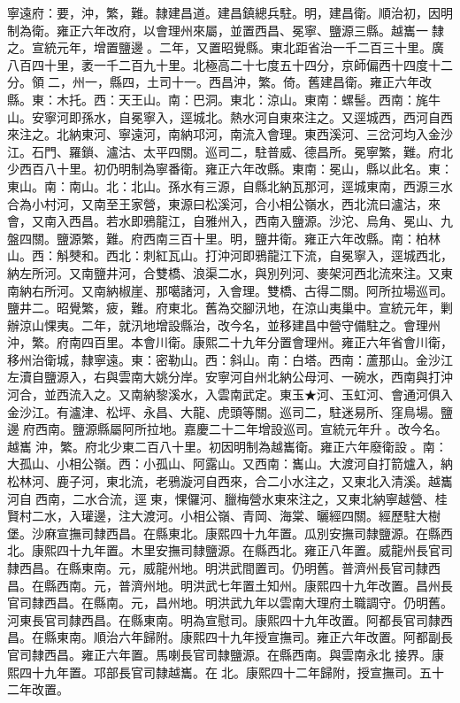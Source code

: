 \begin{pinyinscope}
寧遠府：要，沖，繁，難。隸建昌道。建昌鎮總兵駐。明，建昌衛。順治初，因明制為衛。雍正六年改府，以會理州來屬，並置西昌、冕寧、鹽源三縣。越巂一隸之。宣統元年，增置鹽邊。二年，又置昭覺縣。東北距省治一千二百三十里。廣八百四十里，袤一千二百九十里。北極高二十七度五十四分，京師偏西十四度十二分。領二，州一，縣四，土司十一。西昌沖，繁。倚。舊建昌衛。雍正六年改縣。東：木托。西：天王山。南：巴洞。東北：涼山。東南：螺髻。西南：旄牛山。安寧河即孫水，自冕寧入，逕城北。熱水河自東來注之。又逕城西，西河自西來注之。北納東河、寧遠河，南納邛河，南流入會理。東西溪河、三岔河均入金沙江。石門、羅鎖、瀘沽、太平四關。巡司二，駐普威、德昌所。冕寧繁，難。府北少西百八十里。初仍明制為寧番衛。雍正六年改縣。東南：冕山，縣以此名。東：東山。南：南山。北：北山。孫水有三源，自縣北納瓦那河，逕城東南，西源三水合為小村河，又南至王家營，東源曰松溪河，合小相公嶺水，西北流曰瀘沽，來會，又南入西昌。若水即鴉龍江，自雅州入，西南入鹽源。沙沱、烏角、冕山、九盤四關。鹽源繁，難。府西南三百十里。明，鹽井衛。雍正六年改縣。南：柏林山。西：斛僰和。西北：刺紅瓦山。打沖河即鴉龍江下流，自冕寧入，逕城西北，納左所河。又南鹽井河，合雙橋、浪渠二水，與別列河、麥架河西北流來注。又東南納右所河。又南納椒崖、那噶諸河，入會理。雙橋、古得二關。阿所拉場巡司。鹽井二。昭覺繁，疲，難。府東北。舊為交腳汛地，在涼山夷巢中。宣統元年，剿辦涼山惈夷。二年，就汛地增設縣治，改今名，並移建昌中營守備駐之。會理州沖，繁。府南四百里。本會川衛。康熙二十九年分置會理州。雍正六年省會川衛，移州治衛城，隸寧遠。東：密勒山。西：斜山。南：白塔。西南：蘆那山。金沙江左瀆自鹽源入，右與雲南大姚分岸。安寧河自州北納公母河、一碗水，西南與打沖河合，並西流入之。又南納黎溪水，入雲南武定。東玉★河、玉虹河、會通河俱入金沙江。有瀘津、松坪、永昌、大龍、虎頭等關。巡司二，駐迷易所、窪鳥場。鹽邊府西南。鹽源縣屬阿所拉地。嘉慶二十二年增設巡司。宣統元年升。改今名。越巂沖，繁。府北少東二百八十里。初因明制為越巂衛。雍正六年廢衛設。南：大孤山、小相公嶺。西：小孤山、阿露山。又西南：巂山。大渡河自打箭爐入，納松林河、鹿子河，東北流，老鴉漩河自西來，合二小水注之，又東北入清溪。越巂河自西南，二水合流，逕東，惈儸河、臘梅營水東來注之，又東北納寧越營、桂賢村二水，入瓘邊，注大渡河。小相公嶺、青岡、海棠、曬經四關。經歷駐大樹堡。沙麻宣撫司隸西昌。在縣東北。康熙四十九年置。瓜別安撫司隸鹽源。在縣西北。康熙四十九年置。木里安撫司隸鹽源。在縣西北。雍正八年置。威龍州長官司隸西昌。在縣東南。元，威龍州地。明洪武間置司。仍明舊。普濟州長官司隸西昌。在縣西南。元，普濟州地。明洪武七年置土知州。康熙四十九年改置。昌州長官司隸西昌。在縣南。元，昌州地。明洪武九年以雲南大理府土職調守。仍明舊。河東長官司隸西昌。在縣東南。明為宣慰司。康熙四十九年改置。阿都長官司隸西昌。在縣東南。順治六年歸附。康熙四十九年授宣撫司。雍正六年改置。阿都副長官司隸西昌。雍正六年置。馬喇長官司隸鹽源。在縣西南。與雲南永北接界。康熙四十九年置。邛部長官司隸越巂。在北。康熙四十二年歸附，授宣撫司。五十二年改置。


\end{pinyinscope}
